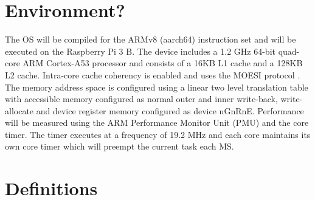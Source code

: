 \documentclass{cys}
\begin{document}
\section{Environment?}
\label{sec:environment?}
The OS will be compiled for the ARMv8 (aarch64) instruction set and will be executed on the Raspberry Pi 3 B.  The device includes a 1.2 GHz 64-bit quad-core ARM Cortex-A53 processor and consists of a 16KB L1 cache and a 128KB L2 cache.  Intra-core cache coherency is enabled and uses the MOESI protocol \cite{https://developer.arm.com/docs/ddi0500/e/level-1-memory-system/cache-behavior/data-cache-coherency}.  The memory address space is configured using a linear two level translation table with accessible memory configured as normal outer and inner write-back, write-allocate and device register memory configured as device nGnRnE.  Performance will be measured using the ARM Performance Monitor Unit (PMU) and the core timer.  The timer executes at a frequency of 19.2 MHz and each core maintains its own core timer which will preempt the current task each MS. \cite{https://www.raspberrypi.org/documentation/hardware/raspberrypi/bcm2836/QA7_rev3.4.pdf}

\section{Definitions}
\label{sec:definitions}
\end{document}
